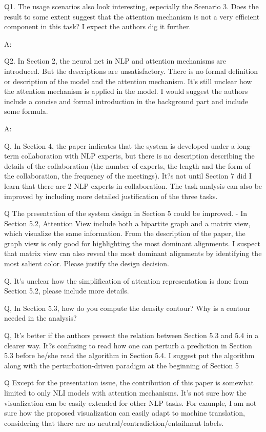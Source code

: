 Q1. The usage scenarios also look interesting, especially the Scenario 3. Does the result to some extent suggest that the attention mechanism is not a very efficient component in this task? I expect the authors dig it further.

A:

Q2. In Section 2, the neural net in NLP and attention mechanisms are introduced. But the descriptions are unsatisfactory. There is no formal definition or description of the model and the attention mechanism. It's still unclear how the attention mechanism is applied in the model. I would suggest the authors include a concise and formal introduction in the background part and include some formula.

A:

Q, In Section 4, the paper indicates that the system is developed under a long-term collaboration with NLP experts, but there is no description describing the details of the collaboration (the number of experts, the length and the form of the collaboration, the frequency of the meetings). It?s not until Section 7 did I learn that there are 2 NLP experts in collaboration. The task analysis can also be improved by including more detailed justification of the three tasks.

Q The presentation of the system design in Section 5 could be improved.
- In Section 5.2, Attention View include both a bipartite graph and a matrix view, which visualize the same information. From the description of the paper, the graph view is only good for highlighting the most dominant alignments. I suspect that matrix view can also reveal the most dominant alignments by identifying the most salient color. Please justify the design decision.

Q, It's unclear how the simplification of attention representation is done from Section 5.2, please include more details.

Q, In Section 5.3, how do you compute the density contour? Why is a contour needed in the analysis?

Q, It's better if the authors present the relation between Section 5.3 and 5.4 in a clearer way. It?s confusing to read how one can perturb a prediction in Section 5.3 before he/she read the algorithm in Section 5.4. I suggest put the algorithm along with the perturbation-driven paradigm at the beginning of Section 5

Q Except for the presentation issue, the contribution of this paper is somewhat limited to only NLI models with attention mechanisms. It's not sure how the visualization can be easily extended for other NLP tasks. For example, I am not sure how the proposed visualization can easily adapt to machine translation, considering that there are no neutral/contradiction/entailment labels.

